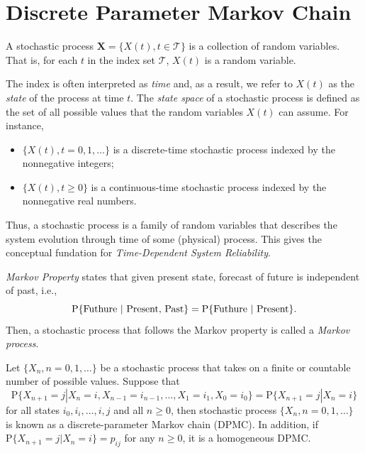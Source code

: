 \documentclass[../Note.tex]{subfiles}
\begin{document}
\chapter{Discrete Parameter Markov Chain} 

\begin{definition}
    A stochastic process $\bm{X} = \{X(t), t \in \mathcal{T}\}$ is a collection of random variables. That is, for each $t$ in the index set $\mathcal{T}$, $X(t)$ is a random variable.
\end{definition}

The index is often interpreted as \textit{time} and, as a result, we refer to $X(t)$ as the \textit{state} of the process at time $t$. The \textit{state space} of a stochastic process is defined as the set of all possible values that the random variables $X(t)$ can assume. For instance,
\begin{itemize}
    \item $\{X(t), t = 0, 1, \dots\}$ is a discrete-time stochastic process indexed by the nonnegative integers;
    \item $\{X(t), t \geq 0\}$ is a continuous-time stochastic process indexed by the nonnegative real numbers. 
\end{itemize}
Thus, a stochastic process is a family of random variables that describes the system evolution through time of some (physical) process. This gives the conceptual fundation for \textit{Time-Dependent System Reliability}.

\textit{Markov Property} states that given present state, forecast of future is independent of past, i.e.,
\[
    \mathrm{P}\{\text{Futhure | \text{Present, Past}}\} = \mathrm{P}\{\text{Futhure | Present}\}.
\]
Then, a stochastic process that follows the Markov property is called a \textit{Markov process}.

\begin{definition}
    Let $\{X_n, n = 0, 1, \dots\}$ be a stochastic process that takes on a finite or countable number of possible values. Suppose that 
    \[
        \mathrm{P}\{X_{n+1} = j | X_{n} = i, X_{n-1} = i_{n-1}, \dots, X_{1} = i_{1}, X_{0} = i_{0}\} = \mathrm{P}\{X_{n+1} = j | X_{n} = i\}
    \]
    for all states $i_0, i_i, \dots, i, j$ and all $n \geq 0$, then stochastic process $\{X_n, n = 0, 1, \dots\}$ is known as a discrete-parameter Markov chain (DPMC). In addition, if $\mathrm{P}\{X_{n+1} = j | X_{n} = i\} = p_{ij}$ for any $n \geq 0$, it is a homogeneous DPMC.
\end{definition}
\end{document}
